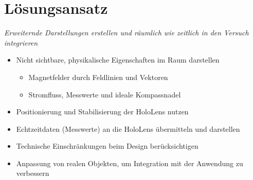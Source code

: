 \part{Lösungsansatz}
\label{part:solution}
\begin{frame}[fragile]{}
	\textit{Erweiternde Darstellungen erstellen und räumlich wie zeitlich in den Versuch integrieren}
	\pause
	\begin{itemize}
		\item Nicht sichtbare, physikalische Eigenschaften im Raum darstellen
		\begin{itemize}[topsep=-5px]
			\setlength{\itemsep}{-5px}
			\item Magnetfelder durch Feldlinien und Vektoren
			\item Stromfluss, Messwerte und ideale Kompassnadel 
		\end{itemize}
		\pause
		\item Positionierung und Stabilisierung der HoloLens nutzen		
		\item Echtzeitdaten (Messwerte) an die HoloLens übermitteln und darstellen
		\item Technische Einschränkungen beim Design berücksichtigen
		\item Anpassung von realen Objekten, um Integration mit der Anwendung zu verbessern
	\end{itemize}
\end{frame}


